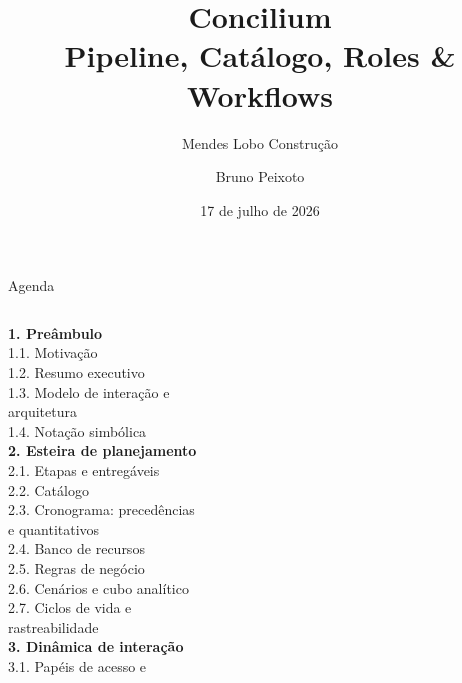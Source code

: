 \documentclass[aspectratio=169,10pt]{beamer}
\title[Concilium — Visão Técnica]{Concilium\\[4pt]\large Pipeline, Catálogo, Roles \& Workflows}
\subtitle{Mendes Lobo Construção}
\author{Bruno Peixoto}
\date{17 de julho de 2026}
\institute{Uso interno --- confidencial}
\begin{document}
\begin{frame}[plain]
  \titlepage
\end{frame}

\begin{frame}{Agenda}
  \begin{columns}[T]
    {\small\textbf{\textcolor{mlblue}{1. Preâmbulo}}}\\[4pt]
    {\footnotesize
    1.1. Motivação\\
    1.2. Resumo executivo\\
    1.3. Modelo de interação e\\
    \hspace*{10pt}arquitetura\\
    1.4. Notação simbólica\\}
    {\small\textbf{\textcolor{mlorange}{2. Esteira de planejamento}}}\\[4pt]
    {\footnotesize
    2.1. Etapas e entregáveis\\
    2.2. Catálogo\\
    2.3. Cronograma: precedências\\
    \hspace*{10pt}e quantitativos\\
    2.4. Banco de recursos\\
    2.5. Regras de negócio\\
    2.6. Cenários e cubo analítico\\
    2.7. Ciclos de vida e\\
    \hspace*{10pt}rastreabilidade\\}
    {\small\textbf{\textcolor{mlpurple}{3. Dinâmica de interação}}}\\[4pt]
    {\footnotesize
    3.1. Papéis de acesso e\\
}
\end{columns}
\end{frame}
\end{document}
